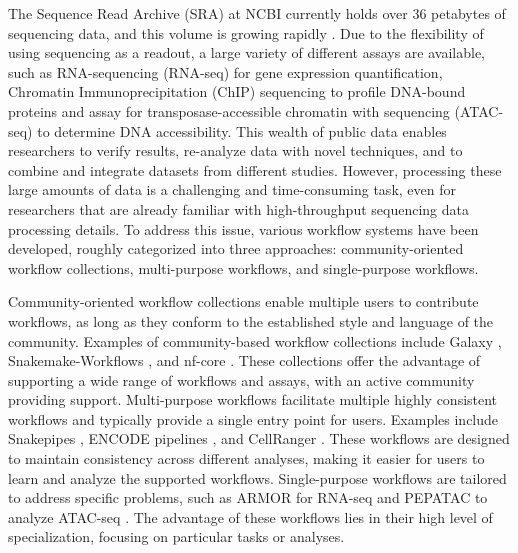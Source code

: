 The Sequence Read Archive (SRA) at NCBI currently holds over 36 petabytes of sequencing data, and this volume is growing rapidly \cite{srawebsite}. Due to the flexibility of using sequencing as a readout, a large variety of different assays are available, such as RNA-sequencing (RNA-seq) \cite{Nagalakshmi2008} for gene expression quantification, Chromatin Immunoprecipitation (ChIP) sequencing \cite{chipseq} to profile DNA-bound proteins and assay for transposase-accessible chromatin with sequencing (ATAC-seq) \cite{Buenrostro_2015} to determine DNA accessibility. This wealth of public data enables researchers to verify results, re-analyze data with novel techniques, and to combine and integrate datasets from different studies. However, processing these large amounts of data is a challenging and time-consuming task, even for researchers that are already familiar with high-throughput sequencing data processing details. To address this issue, various workflow systems have been developed, roughly categorized into three approaches: community-oriented workflow collections, multi-purpose workflows, and single-purpose workflows.

Community-oriented workflow collections enable multiple users to contribute workflows, as long as they conform to the established style and language of the community. Examples of community-based workflow collections include Galaxy \cite{galaxy}, Snakemake-Workflows \cite{snakemakeworkflows}, and nf-core \cite{nfcore}. These collections offer the advantage of supporting a wide range of workflows and assays, with an active community providing support. Multi-purpose workflows facilitate multiple highly consistent workflows and typically provide a single entry point for users. Examples include Snakepipes \cite{snakepipes}, ENCODE pipelines \cite{encode2023}, and CellRanger \cite{Zheng2017}. These workflows are designed to maintain consistency across different analyses, making it easier for users to learn and analyze the supported workflows. Single-purpose workflows are tailored to address specific problems, such as ARMOR for RNA-seq \cite{Orjuela2019} and PEPATAC to analyze ATAC-seq \cite{Smith2021}. The advantage of these workflows lies in their high level of specialization, focusing on particular tasks or analyses.


